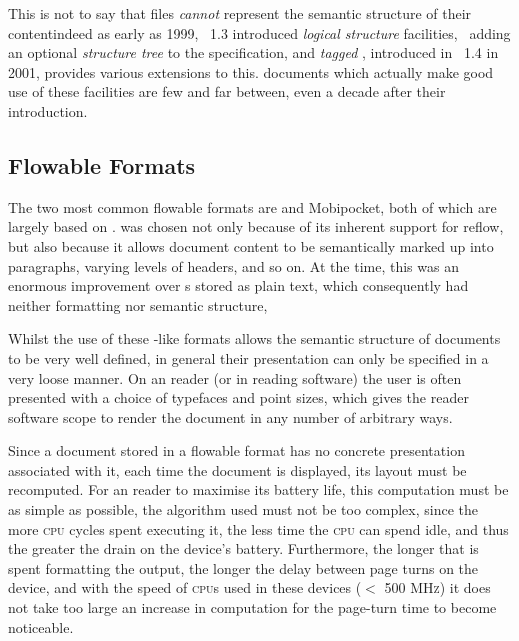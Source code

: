 This is not to say that \pdf{} files \emph{cannot} represent the semantic structure of their content\ed indeed as early as 1999, \pdf{}~1.3 introduced \emph{logical structure} facilities,~\cite{Adobe2001} adding an optional \emph{structure tree} to the \pdf{} specification, and \emph{tagged \pdf{}}, introduced in \pdf{}~1.4 in 2001, provides various extensions to this. \pdf{} documents which actually make good use of these facilities are few and far between, even a decade after their introduction.



\subsection{Flowable Formats}
\label{sec:flowableformats}

The two most common flowable \ebook{} formats are \epub{} and Mobipocket, both of which are largely based on \html{}. \html{} was chosen not only because of its inherent support for reflow, but also because it allows document content to be semantically marked up into paragraphs, varying levels of headers, and so on. At the time, this was an enormous improvement over \ebook{}s stored as plain text, which consequently had neither formatting nor semantic structure, 

Whilst the use of these \html{}-like formats allows the semantic structure of documents to be very well defined, in general their presentation can only be specified in a very loose manner. On an \ebook{} reader (or in \ebook{} reading software) the user is often presented with a choice of typefaces and point sizes, which gives the reader software scope to render the document in any number of arbitrary ways.

Since a document stored in a flowable format has no concrete presentation associated with it, each time the document is displayed, its layout must be recomputed. For an \ebook{} reader to maximise its battery life, this computation must be as simple as possible, \ie{} the algorithm used must not be too complex, since the more \textsc{cpu} cycles spent executing it, the less time the \textsc{cpu} can spend idle, and thus the greater the drain on the device's battery. Furthermore, the longer that is spent formatting the output, the longer the delay between page turns on the device, and with the speed of \textsc{cpu}s used in these devices ($<$ 500 \textsc{MHz}) it does not take too large an increase in computation for the page-turn time to become noticeable.


